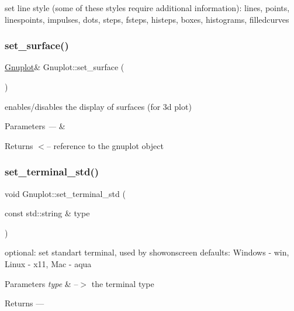 set line style (some of these styles require additional information)\+: lines, points, linespoints, impulses, dots, steps, fsteps, histeps, boxes, histograms, filledcurves \mbox{\label{class_gnuplot_a9825bd26500e30ca88404c4807e6607a}} 
\subsubsection{\texorpdfstring{set\+\_\+surface()}{set\_surface()}}
{\footnotesize\ttfamily \mbox{\hyperlink{class_gnuplot}{Gnuplot}}\& Gnuplot\+::set\+\_\+surface (\begin{DoxyParamCaption}{ }\end{DoxyParamCaption})\hspace{0.3cm}{\ttfamily [inline]}}

enables/disables the display of surfaces (for 3d plot)


\begin{DoxyParams}{Parameters}
{\em ---} & \\
\hline
\end{DoxyParams}
\begin{DoxyReturn}{Returns}
$<$-- reference to the gnuplot object 
\end{DoxyReturn}
\mbox{\label{class_gnuplot_a21feba7a3916708b742c3dc25850ab2f}} 
\subsubsection{\texorpdfstring{set\+\_\+terminal\+\_\+std()}{set\_terminal\_std()}}
{\footnotesize\ttfamily void Gnuplot\+::set\+\_\+terminal\+\_\+std (\begin{DoxyParamCaption}\item[{const std\+::string \&}]{type }\end{DoxyParamCaption})\hspace{0.3cm}{\ttfamily [static]}}

optional\+: set standart terminal, used by showonscreen defaults\+: Windows -\/ win, Linux -\/ x11, Mac -\/ aqua


\begin{DoxyParams}{Parameters}
{\em type} & --$>$ the terminal type\\
\hline
\end{DoxyParams}
\begin{DoxyReturn}{Returns}
--- 
\end{DoxyReturn}
\mbox{\label{class_gnuplot_a4f93bac0e69dd83806652ca7226c6b3b}} 
